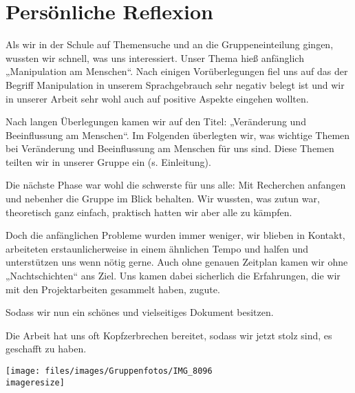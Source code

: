 \chapter{Persönliche Reflexion}
\label{sec:reflexion}

Als wir in der Schule auf Themensuche und an die Gruppeneinteilung gingen, wussten wir schnell, was
uns interessiert. Unser Thema hieß anfänglich „Manipulation am Menschen“. Nach einigen
Vorüberlegungen fiel uns auf das der Begriff Manipulation in unserem Sprachgebrauch sehr negativ
belegt ist und wir in unserer Arbeit sehr wohl auch auf positive Aspekte eingehen wollten.

Nach langen Überlegungen kamen wir auf den Titel: „Veränderung und Beeinflussung am Menschen“. Im
Folgenden überlegten wir, was wichtige Themen bei Veränderung und Beeinflussung am Menschen für uns
sind. Diese Themen teilten wir in unserer Gruppe ein (s. Einleitung).

Die nächste Phase war wohl die schwerste für uns alle: Mit Recherchen anfangen und nebenher die
Gruppe im Blick behalten. Wir wussten, was zutun war, theoretisch ganz einfach, praktisch hatten
wir aber alle zu kämpfen.

Doch die anfänglichen Probleme wurden immer weniger, wir blieben in Kontakt, arbeiteten
erstaunlicherweise in einem ähnlichen Tempo und halfen und unterstützen uns wenn nötig gerne. Auch
ohne genauen Zeitplan kamen wir ohne „Nachtschichten“ ans Ziel. Uns kamen dabei sicherlich die
Erfahrungen, die wir mit den Projektarbeiten gesammelt haben, zugute.

Sodass wir nun ein schönes und vielseitiges Dokument besitzen.

Die Arbeit hat uns oft Kopfzerbrechen bereitet, sodass wir jetzt stolz sind, es geschafft zu haben.

\begin{figurewrapper}
	\texttt{[image: files/images/Gruppenfotos/IMG\_8096\\imageresize]}
	\label{fig:group_picture}
\end{figurewrapper}
